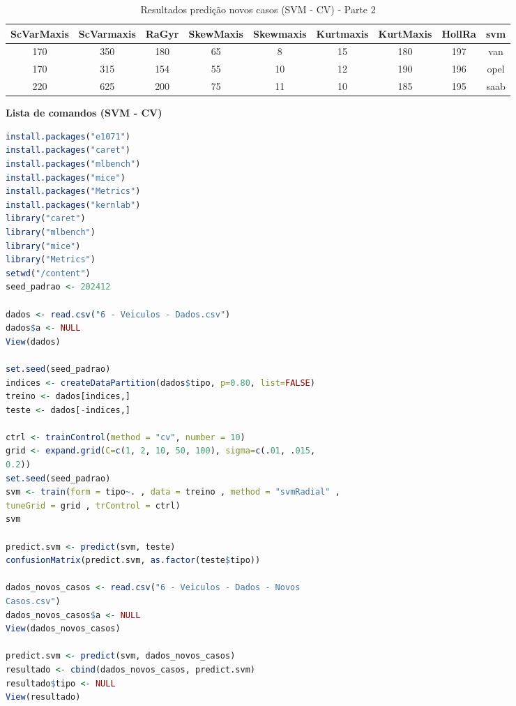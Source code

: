 \begin{table}[H]
\caption{Resultados predição novos casos (SVM - CV) - Parte 2 }
\hspace*{-2.5cm} %
\begin{minipage}{\textwidth}
\centering
\begin{tabular}{|c|c|c|c|c|c|c|c|c|}
\hline
ScVarMaxis & ScVarmaxis & RaGyr & SkewMaxis & Skewmaxis & Kurtmaxis & KurtMaxis & HollRa & svm \\
\hline
170 & 350 & 180 & 65 & 8  & 15 & 180 & 197 & van \\
\hline
170 & 315 & 154 & 55 & 10 & 12 & 190 & 196 & opel \\
\hline
220 & 625 & 200 & 75 & 11 & 10 & 185 & 195 & saab \\
\hline
\end{tabular}
\end{minipage}
\end{table}


\begin{center}
    \textbf{Lista de comandos (SVM - CV)}
\end{center}

\begin{lstlisting}[language=R, style=input]
install.packages("e1071")
install.packages("caret")
install.packages("mlbench")
install.packages("mice")
install.packages("Metrics")
install.packages("kernlab")
library("caret")
library("mlbench")
library("mice")
library("Metrics")
setwd("/content")
seed_padrao <- 202412

dados <- read.csv("6 - Veiculos - Dados.csv")
dados$a <- NULL
View(dados)

set.seed(seed_padrao)
indices <- createDataPartition(dados$tipo, p=0.80, list=FALSE)
treino <- dados[indices,]
teste <- dados[-indices,]

ctrl <- trainControl(method = "cv", number = 10)
grid <- expand.grid(C=c(1, 2, 10, 50, 100), sigma=c(.01, .015,
0.2))
set.seed(seed_padrao)
svm <- train(form = tipo~. , data = treino , method = "svmRadial" ,
tuneGrid = grid , trControl = ctrl)
svm

predict.svm <- predict(svm, teste)
confusionMatrix(predict.svm, as.factor(teste$tipo))

dados_novos_casos <- read.csv("6 - Veiculos - Dados - Novos
Casos.csv")
dados_novos_casos$a <- NULL
View(dados_novos_casos)

predict.svm <- predict(svm, dados_novos_casos)
resultado <- cbind(dados_novos_casos, predict.svm)
resultado$tipo <- NULL
View(resultado)
\end{lstlisting}

